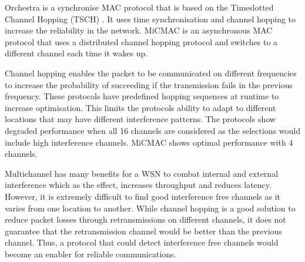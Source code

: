 Orchestra \cite{orchestra} is a synchronise MAC protocol
that is based on the Timeslotted Channel Hopping (TSCH) \cite{tsch}. It uses time synchronisation and channel hopping to increase the reliability in the network. 
MiCMAC \cite{micmac} is an asynchronous MAC protocol that uses a distributed channel hopping protocol and switches to a different channel each time it wakes up.

Channel hopping enables the packet to be communicated on different frequencies to increase the probability of succeeding if the transmission fails in the previous frequency. 
These protocols have predefined hopping sequences at runtime to increase optimisation. This limits the protocols ability to adapt to different locations that may have different interference patterns. The protocols show degraded performance when all 16 channels are considered as the selections would include high interference channels. MiCMAC shows optimal performance with 4 channels. 

Multichannel has many benefits for a WSN to combat internal and external interference which as the effect, increases throughput and reduces latency.
However, it is extremely difficult to find good interference free channels as it varies from one location to another. While channel hopping is a good solution to reduce packet losses through retransmissions on different channels, it does not guarantee that the retransmission channel would be better than the previous channel. Thus, a protocol that could detect interference free channels would become an enabler for reliable communications.


